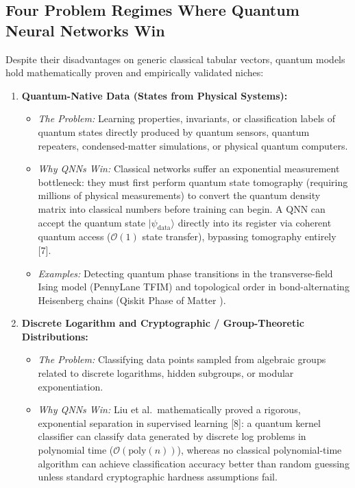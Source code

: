 \subsection{Four Problem Regimes Where Quantum Neural Networks Win}
Despite their disadvantages on generic classical tabular vectors, quantum models hold mathematically proven and empirically validated niches:
\begin{enumerate}[leftmargin=*]
  \item \textbf{Quantum-Native Data (States from Physical Systems):}
  \begin{itemize}[leftmargin=*]
    \item \emph{The Problem:} Learning properties, invariants, or classification labels of quantum states directly produced by quantum sensors, quantum repeaters, condensed-matter simulations, or physical quantum computers.
    \item \emph{Why QNNs Win:} Classical networks suffer an exponential measurement bottleneck: they must first perform quantum state tomography (requiring millions of physical measurements) to convert the quantum density matrix into classical numbers before training can begin. A QNN can accept the quantum state $|\psi_{\text{data}}\rangle$ directly into its register via coherent quantum access ($\mathcal{O}(1)$ state transfer), bypassing tomography entirely [7].
    \item \emph{Examples:} Detecting quantum phase transitions in the transverse-field Ising model (PennyLane TFIM) and topological order in bond-alternating Heisenberg chains (Qiskit Phase of Matter \cite{bermejo2024quantum}).
  \end{itemize}
  \item \textbf{Discrete Logarithm and Cryptographic / Group-Theoretic Distributions:}
  \begin{itemize}[leftmargin=*]
    \item \emph{The Problem:} Classifying data points sampled from algebraic groups related to discrete logarithms, hidden subgroups, or modular exponentiation.
    \item \emph{Why QNNs Win:} Liu et al.\ mathematically proved a rigorous, exponential separation in supervised learning [8]: a quantum kernel classifier can classify data generated by discrete log problems in polynomial time ($\mathcal{O}(\text{poly}(n))$), whereas no classical polynomial-time algorithm can achieve classification accuracy better than random guessing unless standard cryptographic hardness assumptions fail.
  \end{itemize}

\end{enumerate}
